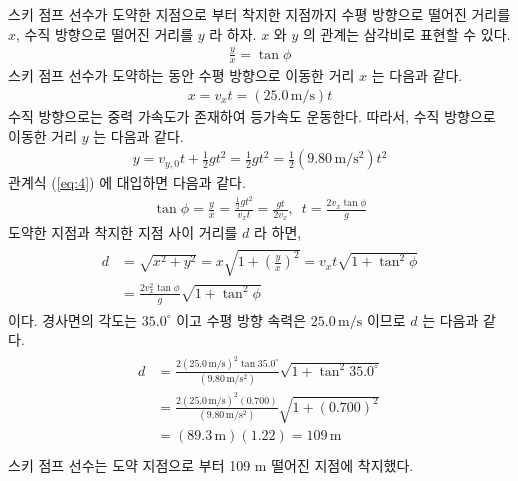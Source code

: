 \documentclass[floatfix,nofootinbib,superscriptaddress,fleqn,preprint]{revtex4}
\begin{document}
 스키 점프 선수가 도약한 지점으로 부터 착지한 지점까지 
수평 방향으로 떨어진 거리를 $x$, 수직 방향으로 떨어진 거리를 $y$ 라 하자.
$x$ 와 $y$ 의 관계는 삼각비로 표현할 수 있다.
\begin{align}\label{eq:4}
  \frac{y}{x}=\tan{\phi}
\end{align}
스키 점프 선수가 도약하는 동안 수평 방향으로 이동한 거리 $x$ 는 다음과 같다.
\begin{align}
  x=v_xt=(25.0\,\mathrm{m/s})t 
\end{align}
수직 방향으로는 중력 가속도가 존재하여 등가속도 운동한다. 따라서, 수직 방향으로
이동한 거리 $y$ 는 다음과 같다.
\begin{align}
  y=v_{y,0}t+\frac{1}{2}gt^2=\frac{1}{2}gt^2=\frac{1}{2}(9.80\,\mathrm{m/s^2})t^2
\end{align}
관계식 (\ref{eq:4}) 에 대입하면 다음과 같다.
\begin{align}
  \tan{\phi} = \frac{y}{x} = \frac{\frac{1}{2}gt^2}{v_xt}=\frac{gt}{2v_x},\,\,\,
  t=\frac{2v_x\tan{\phi}}{g}
\end{align}
도약한 지점과 착지한 지점 사이 거리를 $d$ 라 하면, 
\begin{align}
  \begin{split}
    d&=\sqrt{x^2+y^2}=x\sqrt{1+\left(\frac{y}{x}\right)^2}=v_xt\sqrt{1+\tan^2{\phi}} \\
    &=\frac{2v_x^2\tan{\phi}}{g}\sqrt{1+\tan^2{\phi}}
  \end{split}
\end{align}
이다.
경사면의 각도는 $35.0^\circ$ 이고 수평 방향 속력은 $25.0\,\mathrm{m/s}$ 이므로 $d$ 는
다음과 같다.
\begin{align}
  \begin{split}
    d&=\frac{2(25.0\,\mathrm{m/s})^2\tan{35.0^\circ}}{(9.80\,\mathrm{m/s^2})}\sqrt{1+\tan^2{35.0^\circ}} \\
    &= \frac{2(25.0\,\mathrm{m/s})^2 (0.700)}{(9.80\,\mathrm{m/s^2})}\sqrt{1+(0.700)^2} \\
    &= (89.3\,\mathrm{m})(1.22) = 109\,\mathrm{m} \\
  \end{split}
\end{align}
스키 점프 선수는 도약 지점으로 부터 109 m 떨어진 지점에 착지했다.

\vspace{2cm}
\end{document}

